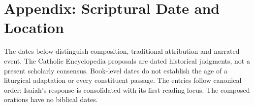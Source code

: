 \section{Appendix: Scriptural Date and Location}

The dates below distinguish composition, traditional attribution and narrated event. The Catholic Encyclopedia proposals are dated historical judgments, not a present scholarly consensus. Book-level dates do not establish the age of a liturgical adaptation or every constituent passage. The entries follow canonical order; Isaiah's response is consolidated with its first-reading locus. The composed orations have no biblical dates.

